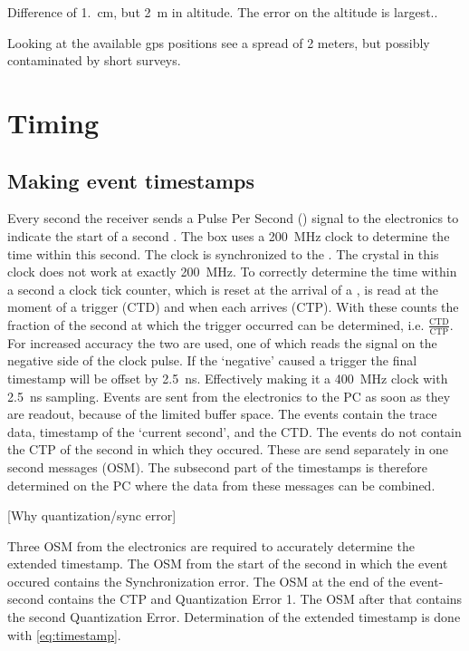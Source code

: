 Difference of \SI{1.}{\centi\meter}, but \SI{2}{\meter} in altitude.
The error on the \gps altitude is largest..

Looking at the available gps positions see a spread of 2 meters, but possibly contaminated by short surveys.


\section{Timing}

\subsection{Making event timestamps}
\label{sub:gps_timestamps}

Every second the \gps receiver sends a Pulse Per Second (\pps) signal to the \hisparc electronics to indicate the start of a second \cite{verkooijen2008firmware}. The \hisparc box uses a \SI{200}{\mega\hertz} clock to determine the time within this second. The clock is synchronized to the \pps. The crystal in this clock does not work at exactly \SI{200}{\mega\hertz}. To correctly determine the time within a second a clock tick counter, which is reset at the arrival of a \pps, is read at the moment of a trigger (CTD) and when each \pps arrives (CTP). With these counts the fraction of the second at which the trigger occurred can be determined, i.e. $\frac{\mathrm{CTD}}{\mathrm{CTP}}$. For increased accuracy the two \adcs are used, one of which reads the signal on the negative side of the clock pulse. If the `negative' \adc caused a trigger the final timestamp will be offset by \SI{2.5}{\ns}. Effectively making it a \SI{400}{\mega\hertz} clock with \SI{2.5}{\ns} sampling. Events are sent from the \hisparc electronics to the PC as soon as they are readout, because of the limited buffer space. The events contain the trace data, timestamp of the `current second', and the CTD. The events do not contain the CTP of the second in which they occured. These are send separately in one second messages (OSM). The subsecond part of the timestamps is therefore determined on the PC where the data from these messages can be combined.

[Why quantization/sync error]

Three OSM from the electronics are required to accurately determine the extended timestamp. The OSM from the start of the second in which the event occured contains the Synchronization error. The OSM at the end of the event-second contains the CTP and Quantization Error 1. The OSM after that contains the second Quantization Error. Determination of the extended timestamp is done with \cref{eq:timestamp}.

